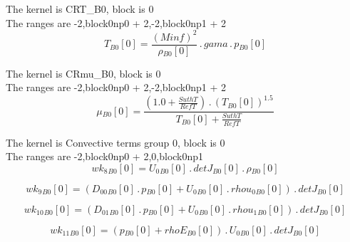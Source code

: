 \documentclass{article}
\begin{document}
\noindent The kernel is CRT_B0, block is 0\\\noindent The ranges are -2,block0np0 + 2,-2,block0np1 + 2\\\begin{dmath}{T{_{B0}}}[{0}] = \frac{\left(Minf \right)^{2}}{{\rho{_{B0}}}[{0}]} \,.\, gama \,.\, {p{_{B0}}}[{0}]\end{dmath}

\noindent The kernel is CRmu_B0, block is 0\\\noindent The ranges are -2,block0np0 + 2,-2,block0np1 + 2\\\begin{dmath}{\mu{_{B0}}}[{0}] = \frac{\left(1.0 + \frac{SuthT}{RefT}\right) \,.\, \left({T{_{B0}}}[{0}] \right)^{1.5}}{{T{_{B0}}}[{0}] + \frac{SuthT}{RefT}}\end{dmath}

\noindent The kernel is Convective terms group 0, block is 0\\\noindent The ranges are -2,block0np0 + 2,0,block0np1\\\begin{dmath}{wk_{8}{_{B0}}}[{0}] = {U_{0}{_{B0}}}[{0}] \,.\, {detJ{_{B0}}}[{0}] \,.\, {\rho{_{B0}}}[{0}]\end{dmath}

\begin{dmath}{wk_{9}{_{B0}}}[{0}] = \left({D_{00}{_{B0}}}[{0}] \,.\, {p{_{B0}}}[{0}] + {U_{0}{_{B0}}}[{0}] \,.\, {rhou_{0}{_{B0}}}[{0}]\right) \,.\, {detJ{_{B0}}}[{0}]\end{dmath}

\begin{dmath}{wk_{10}{_{B0}}}[{0}] = \left({D_{01}{_{B0}}}[{0}] \,.\, {p{_{B0}}}[{0}] + {U_{0}{_{B0}}}[{0}] \,.\, {rhou_{1}{_{B0}}}[{0}]\right) \,.\, {detJ{_{B0}}}[{0}]\end{dmath}

\begin{dmath}{wk_{11}{_{B0}}}[{0}] = \left({p{_{B0}}}[{0}] + {rhoE{_{B0}}}[{0}]\right) \,.\, {U_{0}{_{B0}}}[{0}] \,.\, {detJ{_{B0}}}[{0}]\end{dmath}
\end{document}
